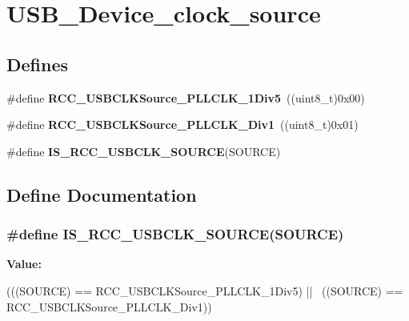 \hypertarget{group__USB__Device__clock__source}{
\section{USB\_\-Device\_\-clock\_\-source}
\label{group__USB__Device__clock__source}
}
\subsection*{Defines}
\begin{DoxyCompactItemize}
\item 
\hypertarget{group__USB__Device__clock__source_ga5e7a39e25fc37fd2b90edfe66bf1f53f}{
\#define {\bfseries RCC\_\-USBCLKSource\_\-PLLCLK\_\-1Div5}~((uint8\_\-t)0x00)}
\label{group__USB__Device__clock__source_ga5e7a39e25fc37fd2b90edfe66bf1f53f}

\item 
\hypertarget{group__USB__Device__clock__source_ga8162727793b5690d6b96ad0cc7ce3866}{
\#define {\bfseries RCC\_\-USBCLKSource\_\-PLLCLK\_\-Div1}~((uint8\_\-t)0x01)}
\label{group__USB__Device__clock__source_ga8162727793b5690d6b96ad0cc7ce3866}

\item 
\#define {\bfseries IS\_\-RCC\_\-USBCLK\_\-SOURCE}(SOURCE)
\end{DoxyCompactItemize}


\subsection{Define Documentation}
\hypertarget{group__USB__Device__clock__source_ga484f7834b5506d9879ed84660c894250}{
\subsubsection[{IS\_\-RCC\_\-USBCLK\_\-SOURCE}]{\setlength{\rightskip}{0pt plus 5cm}\#define IS\_\-RCC\_\-USBCLK\_\-SOURCE(SOURCE)}}
\label{group__USB__Device__clock__source_ga484f7834b5506d9879ed84660c894250}
{\bfseries Value:}
\begin{DoxyCode}
(((SOURCE) == RCC_USBCLKSource_PLLCLK_1Div5) || \
                                      ((SOURCE) == RCC_USBCLKSource_PLLCLK_Div1))
      
\end{DoxyCode}
